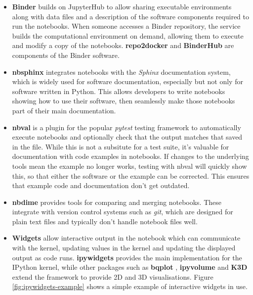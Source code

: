 \begin{itemize}
  \item \textbf{Binder} builds on JupyterHub to allow sharing executable
  environments along with data files and a description of the software components
  required to run the notebooks. When someone accesses a Binder repository,
  the service builds the computational environment on demand, allowing them to
  execute and modify a copy of the notebooks.
  \textbf{repo2docker} \cite{repo2docker} and \textbf{BinderHub} \cite{binder} are components of the Binder
  software.

  \item \textbf{nbsphinx} \cite{Nbsphinx} integrates notebooks with the \emph{Sphinx}
  documentation system, which is widely used for software documentation,
  especially but not only for software written in Python.
  This allows developers to write notebooks showing how to use their software,
  then seamlessly make those notebooks part of their main documentation.

  \item \textbf{nbval} \cite{nbval} is a plugin for the popular \emph{pytest} testing
  framework to automatically execute notebooks and optionally check that the
  output matches that saved in the file. While this is not a subsitute for a
  test suite, it's valuable for documentation with code examples in notebooks.
  If changes to the underlying tools mean the example no longer
  works, testing with nbval will quickly show this, so that either the software
  or the example can be corrected. This ensures that example code and
  documentation don't get outdated.

  \item \textbf{nbdime} \cite{nbdime} provides tools for comparing and merging notebooks.
  These integrate with version control systems such as \emph{git}, which
  are designed for plain text files and typically don't handle notebook files
  well.

  \item \textbf{Widgets} allow interactive output in the notebook which can
  communicate with the kernel, updating values in the kernel and updating the
  displayed output as code runs. \textbf{ipywidgets} \cite{ipywidgets} provides the main
  implementation for the IPython kernel, while other packages such as
  \textbf{bqplot} \cite{bqplot}, \textbf{ipyvolume} \cite{ipyvolume} and
  \textbf{K3D} \cite{K3D} extend the framework to provide 2D and 3D visualisations.
  Figure \ref{fig:ipywidgets-example} shows a simple example of interactive
  widgets in use.


\end{itemize}
